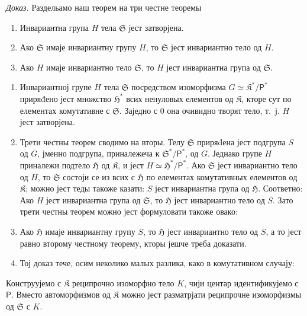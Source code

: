 \documentclass[11pt]{article}
\begin{document}
\emph{Доказ.} Раздельамо наш теорем на три честне теоремы
\begin{enumerate}
\item Инвариантна група \(H\) тела \(\mathfrak S\) јест затворјена.
\item Ако \(\mathfrak S\) имаје инвариантну групу \(H\), то \(\mathfrak S\) јест инвариантно тело од \(H\).
\item Ако \(H\) имаје инвариантно тело \(\mathfrak S\), то \(H\) јест инвариантна група од \(\mathfrak S\).
\end{enumerate}

\begin{enumerate}
\item Инвариантној групе \(H\) тела \(\mathfrak S\) посредством изоморфизма \(G\simeq \mathfrak K^*/\mathsf P^*\) приряđено јест множство \(\mathfrak H^*\) всих ненуловых елементов од \(\mathfrak K\), кторе сут по елементах комутативне с \(\mathfrak S\). Заједно с 0 она очивидно творят тело, т.~ј. \(H\) јест затворјена.

\item Трети честны теорем сводимо на вторы. Телу \(\mathfrak S\) приряđена јест подгрупа \(S\) од \(G\), јменно подгрупа, приналежеча к \(\mathfrak S^*/\mathsf P^*\), од \(G\). Једнако групе \(H\) приналежи подтело \(\mathfrak H\) од \(\mathfrak K\), и јест \(H\simeq \mathfrak H^*/\mathsf P^*\). Ако \(\mathfrak S\) јест инвариантно тело од \(H\), то \(\mathfrak S\) состоји се из всих с \(\mathfrak H\) по елементах комутативных елементов од \(\mathfrak K\); можно јест теды такоже казати: \(S\) јест инвариантна група од \(\mathfrak H\). Соответно: Ако \(H\) јест инвариантна група од \(\mathfrak S\), то \(\mathfrak H\) јест инвариантно тело од \(S\). Зато трети честны теорем можно јест формуловати такоже овако:

\item[\(3'\).] Ако \(\mathfrak H\) имаје инвариантну групу \(S\), то \(\mathfrak H\) јест инвариантно тело од \(S\), а то јест равно второму честному теорему, кторы јешче треба доказати.

\item[3.] Тој доказ тече, осим неколико малых разлика, како в комутативном случају:
\end{enumerate}

Конструујемо с \(\mathfrak K\) реципрочно изоморфно тело \(K\), чији центар идентификујемо с \(\mathsf P\). Вместо автоморфизмов од \(\mathfrak K\) можно јест разматрјати реципрочне изоморфизмы од \(\mathfrak S\) с \(K\).
\end{document}

